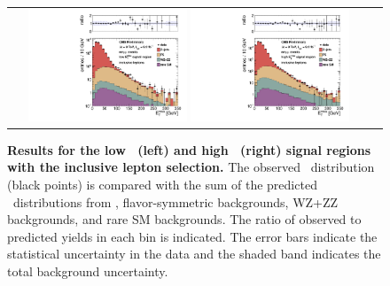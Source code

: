\begin{figure}[!h]
\begin{center}
\begin{tabular}{cc}
\includegraphics[width=0.45\textwidth]{plots/edge_pfmet_pt40_lowMet_all.pdf}
\includegraphics[width=0.45\textwidth]{plots/edge_pfmet_pt40_highMet_all.pdf}
\end{tabular}
\caption{\footnotesize {\bf Results for the low \MET\ (left) and high \MET\ (right) signal regions with the inclusive lepton selection.}
The observed \MET\ distribution (black points) is compared with the sum of the predicted \MET\
distributions from \zjets, flavor-symmetric backgrounds, WZ+ZZ backgrounds, and rare SM backgrounds. 
The ratio of observed to predicted yields in each bin is
indicated. The error bars indicate the statistical uncertainty in the data and the shaded band indicates the total background uncertainty.
\label{fig:results_inclusive}
}
\end{center}
\end{figure}

